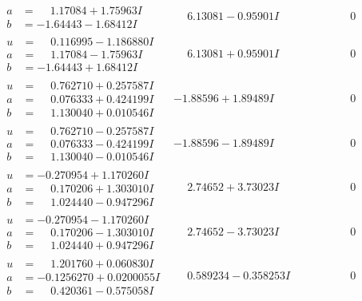 \documentclass[1p]{elsarticle_modified}
\theoremstyle{definition}
\begin{document}
$$\begin{array}{c|c|c}
\begin{aligned}
a &= \phantom{-}1.17084 + 1.75963 I \\
b &= -1.64443 - 1.68412 I\end{aligned}
 & \phantom{-}6.13081 - 0.95901 I & \phantom{-0.000000 } 0 \\ \hline\begin{aligned}
u &= \phantom{-}0.116995 - 1.186880 I \\
a &= \phantom{-}1.17084 - 1.75963 I \\
b &= -1.64443 + 1.68412 I\end{aligned}
 & \phantom{-}6.13081 + 0.95901 I & \phantom{-0.000000 } 0 \\ \hline\begin{aligned}
u &= \phantom{-}0.762710 + 0.257587 I \\
a &= \phantom{-}0.076333 + 0.424199 I \\
b &= \phantom{-}1.130040 + 0.010546 I\end{aligned}
 & -1.88596 + 1.89489 I & \phantom{-0.000000 } 0 \\ \hline\begin{aligned}
u &= \phantom{-}0.762710 - 0.257587 I \\
a &= \phantom{-}0.076333 - 0.424199 I \\
b &= \phantom{-}1.130040 - 0.010546 I\end{aligned}
 & -1.88596 - 1.89489 I & \phantom{-0.000000 } 0 \\ \hline\begin{aligned}
u &= -0.270954 + 1.170260 I \\
a &= \phantom{-}0.170206 + 1.303010 I \\
b &= \phantom{-}1.024440 - 0.947296 I\end{aligned}
 & \phantom{-}2.74652 + 3.73023 I & \phantom{-0.000000 } 0 \\ \hline\begin{aligned}
u &= -0.270954 - 1.170260 I \\
a &= \phantom{-}0.170206 - 1.303010 I \\
b &= \phantom{-}1.024440 + 0.947296 I\end{aligned}
 & \phantom{-}2.74652 - 3.73023 I & \phantom{-0.000000 } 0 \\ \hline\begin{aligned}
u &= \phantom{-}1.201760 + 0.060830 I \\
a &= -0.1256270 + 0.0200055 I \\
b &= \phantom{-}0.420361 - 0.575058 I\end{aligned}
 & \phantom{-}0.589234 - 0.358253 I & \phantom{-0.000000 } 0 \\ \hline\begin{aligned}

\end{aligned}
\end{array}$$
\end{document}
